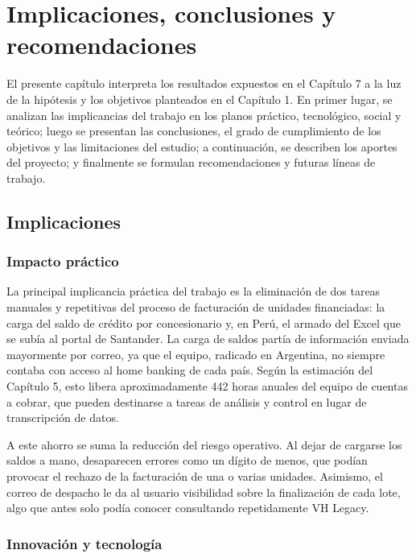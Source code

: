 \chapter{Implicaciones, conclusiones y recomendaciones}\label{cap:conclusiones}

El presente capítulo interpreta los resultados expuestos en el Capítulo 7 a la luz de la hipótesis y los objetivos planteados en el Capítulo 1. En primer lugar, se analizan las implicancias del trabajo en los planos práctico, tecnológico, social y teórico; luego se presentan las conclusiones, el grado de cumplimiento de los objetivos y las limitaciones del estudio; a continuación, se describen los aportes del proyecto; y finalmente se formulan recomendaciones y futuras líneas de trabajo.

\section{Implicaciones}

\subsection{Impacto práctico}

La principal implicancia práctica del trabajo es la eliminación de dos tareas manuales y repetitivas del proceso de facturación de unidades financiadas: la carga del saldo de crédito por concesionario y, en Perú, el armado del Excel que se subía al portal de Santander. La carga de saldos partía de información enviada mayormente por correo, ya que el equipo, radicado en Argentina, no siempre contaba con acceso al home banking de cada país. Según la estimación del Capítulo 5, esto libera aproximadamente 442 horas anuales del equipo de cuentas a cobrar, que pueden destinarse a tareas de análisis y control en lugar de transcripción de datos.

A este ahorro se suma la reducción del riesgo operativo. Al dejar de cargarse los saldos a mano, desaparecen errores como un dígito de menos, que podían provocar el rechazo de la facturación de una o varias unidades. Asimismo, el correo de despacho le da al usuario visibilidad sobre la finalización de cada lote, algo que antes solo podía conocer consultando repetidamente VH Legacy.

\subsection{Innovación y tecnología}

